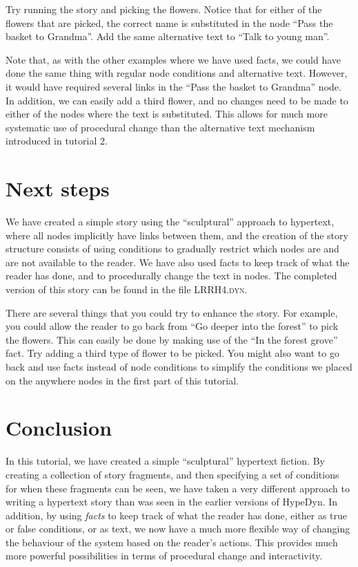 \documentclass{article}
\begin{document}
Try running the story and picking the flowers. Notice that for either of the
flowers that are picked, the correct name is substituted in the node ``Pass the
basket to Grandma''. Add the same alternative text to ``Talk to young man''.

Note that, as with the other examples where we have used facts, we could have
done the same thing with regular node conditions and alternative text. However,
it would have required several links in the ``Pass the basket to Grandma'' node.
In addition, we can easily add a third flower, and no changes need to be made to
either of the nodes where the text is substituted. This allows for much more
systematic use of procedural change than the alternative text mechanism
introduced in tutorial 2.

\section{Next steps}

We have created a simple story using the ``sculptural'' approach to hypertext,
where all nodes implicitly have links between them, and the creation of the
story structure consists of using conditions to gradually restrict which nodes
are and are not available to the reader. We have also used facts to keep track
of what the reader has done, and to procedurally change the text in nodes. The
completed version of this story can be found in the file \textsc{LRRH4.dyn}.

There are several things that you could try to enhance the story. For example,
you could allow the reader to go back from ``Go deeper into the forest'' to pick
the flowers. This can easily be done by making use of the ``In the forest grove''
fact. Try adding a third type of flower to be picked. You might also want to go
back and use facts instead of node conditions to simplify the conditions we
placed on the anywhere nodes in the first part of this tutorial.

\section{Conclusion}

In this tutorial, we have created a simple ``sculptural'' hypertext fiction. By
creating a collection of story fragments, and then specifying a set of
conditions for when these fragments can be seen, we have taken a very different
approach to writing a hypertext story than was seen in the earlier versions of
HypeDyn. In addition, by using \textit{facts} to keep track of what the reader
has done, either as true or false conditions, or as text, we now have a much
more flexible way of changing the behaviour of the system based on the reader's
actions. This provides much more powerful possibilities in terms of
procedural change and interactivity.
\end{document}
